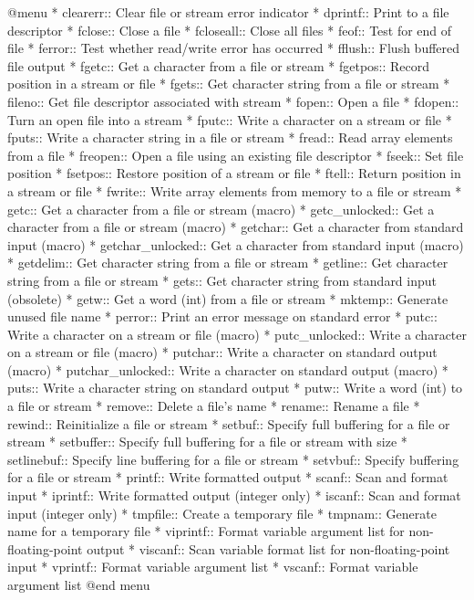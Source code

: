 @menu  
* clearerr::    Clear file or stream error indicator
* dprintf::     Print to a file descriptor
* fclose::      Close a file
* fcloseall::   Close all files
* feof::        Test for end of file
* ferror::      Test whether read/write error has occurred
* fflush::      Flush buffered file output
* fgetc::       Get a character from a file or stream
* fgetpos::     Record position in a stream or file
* fgets::       Get character string from a file or stream
* fileno::      Get file descriptor associated with stream
* fopen::       Open a file
* fdopen::	Turn an open file into a stream
* fputc::       Write a character on a stream or file
* fputs::       Write a character string in a file or stream
* fread::       Read array elements from a file
* freopen::     Open a file using an existing file descriptor
* fseek::       Set file position
* fsetpos::     Restore position of a stream or file
* ftell::       Return position in a stream or file
* fwrite::      Write array elements from memory to a file or stream
* getc::        Get a character from a file or stream (macro)
* getc_unlocked::	Get a character from a file or stream (macro)
* getchar::     Get a character from standard input (macro)
* getchar_unlocked::	Get a character from standard input (macro)
* getdelim::    Get character string from a file or stream
* getline::     Get character string from a file or stream
* gets::        Get character string from standard input (obsolete)
* getw::        Get a word (int) from a file or stream
* mktemp::      Generate unused file name
* perror::      Print an error message on standard error
* putc::        Write a character on a stream or file (macro)
* putc_unlocked::	Write a character on a stream or file (macro)
* putchar::     Write a character on standard output (macro)
* putchar_unlocked::	Write a character on standard output (macro)
* puts::        Write a character string on standard output
* putw::        Write a word (int) to a file or stream
* remove::      Delete a file's name
* rename::      Rename a file
* rewind::      Reinitialize a file or stream
* setbuf::      Specify full buffering for a file or stream
* setbuffer::   Specify full buffering for a file or stream with size
* setlinebuf::  Specify line buffering for a file or stream
* setvbuf::     Specify buffering for a file or stream
* printf::      Write formatted output
* scanf::       Scan and format input
* iprintf::     Write formatted output (integer only)
* iscanf::      Scan and format input (integer only)
* tmpfile::     Create a temporary file
* tmpnam::      Generate name for a temporary file
* viprintf::    Format variable argument list for non-floating-point output
* viscanf::     Scan variable format list for non-floating-point input
* vprintf::     Format variable argument list
* vscanf::      Format variable argument list
@end menu 

